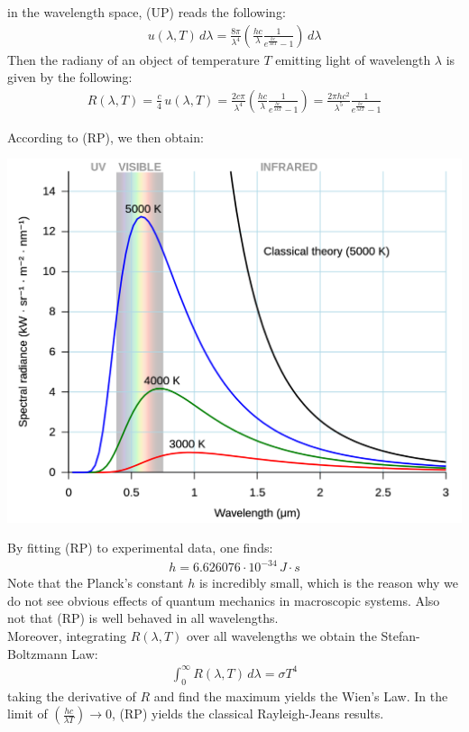 \documentclass[11pt]{article}
\theoremstyle{break}
\theoremstyle{break}
\newcommand{\ee}[1]{\cdot 10^{#1}}
\begin{document}
in the wavelength space, (UP) reads the following:
\begin{align*}
u(\lambda, T) \, d\lambda = \frac{8\pi}{\lambda^4}\left( \frac{hc}{\lambda}\frac{1}{e^{\frac{hc}{\lambda kT}}-1}\right) \, d\lambda
\end{align*}
Then the radiany of an object of temperature $T$ emitting light of wavelength $\lambda$ is given by the following:
\begin{align}
R(\lambda, T) = \frac{c}{4}\, u(\lambda, T) = \frac{2c \pi}{\lambda^4}\left( \frac{hc}{\lambda}\frac{1}{e^{\frac{hc}{\lambda kT}}-1}\right) = \frac{2\pi hc^2}{\lambda^5} \frac{1}{e^{\frac{hc}{\lambda kT}} - 1} \tag{RP}
\end{align}

According to (RP), we then obtain: \begin{center}
\includegraphics[scale=0.25]{Black_body.svg.png}
\end{center}

By fitting (RP) to experimental data, one finds:
\begin{align*}
h = 6.626076 \ee{-34}\, J\cdot s
\end{align*}
Note that the Planck's constant $h$ is incredibly small, which is the reason why we do not see obvious effects of quantum mechanics in macroscopic systems. Also not that (RP) is well behaved in all wavelengths.\\

Moreover, integrating $R(\lambda,T)$ over all wavelengths we obtain the Stefan-Boltzmann Law:
\begin{align*}
\int_0^{\infty} R(\lambda, T) \, d\lambda = \sigma T^4
\end{align*}
taking the derivative of $R$ and find the maximum yields the Wien's Law. In the limit of $(\frac{hc}{\lambda T})\to 0$, (RP) yields the classical Rayleigh-Jeans results. \\
\end{document}
